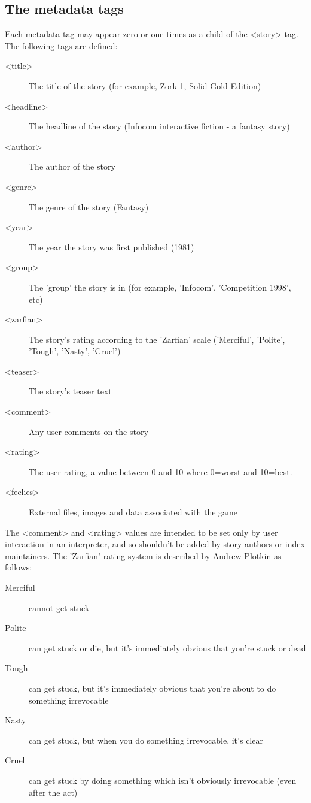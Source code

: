 \documentclass[a4paper,11pt]{article}
\begin{document}
\subsection{The metadata tags}

Each metadata tag may appear zero or one times as a child of  the <story> tag. The following
tags are defined:

\begin{description}
\item[<title>] The title of the story (for example, Zork 1, Solid Gold Edition)
\item[<headline>] The headline of the story (Infocom interactive fiction - a fantasy story)
\item[<author>] The author of the story
\item[<genre>] The genre of the story (Fantasy)
\item[<year>] The year the story was first published (1981)
\item[<group>] The 'group' the story is in (for example, 'Infocom', 'Competition 1998', etc)
\item[<zarfian>] The story's rating according to the 'Zarfian' scale ('Merciful', 'Polite', 
'Tough', 'Nasty', 'Cruel')
\item[<teaser>] The story's teaser text
\\
\item[<comment>] Any user comments on the story
\item[<rating>] The user rating, a value between 0 and 10 where 0=worst and 10=best.
\item[<feelies>] External files, images and data associated with the game
\end{description}

The <comment> and <rating> values are intended to be set only by user interaction in an
interpreter, and so shouldn't be added by story authors or index maintainers. The 'Zarfian'
rating system is described by Andrew Plotkin as follows:

\begin{description}
\item[Merciful] cannot get stuck
\item[Polite] can get stuck or die, but it's immediately obvious that you're stuck or dead
\item[Tough] can get stuck, but it's immediately obvious that you're about to do something 
irrevocable
\item[Nasty] can get stuck, but when you do something irrevocable, it's clear 
\item[Cruel] can get stuck by doing something which isn't obviously irrevocable (even after the act)
\end{description}
\end{document}
